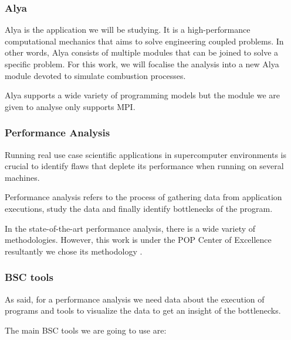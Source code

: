 \subsubsection{Alya}

\justify
Alya\cite{alya} is the application we will be studying.  It is a high-performance computational mechanics that aims to solve engineering coupled problems. In other words, Alya consists of multiple modules that can be joined to solve a specific problem. For this work, we will focalise the analysis into a new Alya module devoted to simulate combustion processes.

\justify
Alya supports a wide variety of programming models but the module we are given to analyse only supports MPI.

\subsubsection{Performance Analysis}

\justify
Running real use case scientific applications in supercomputer environments is crucial to identify flaws that deplete its performance when running on several machines.

\justify
Performance analysis refers to the process of gathering data from application executions, study the data and finally identify bottlenecks of the program.

\justify
In the state-of-the-art performance analysis, there is a wide variety of methodologies. However, this work is under the POP Center of Excellence resultantly we chose its methodology \cite{popMethod}.

\subsubsection{BSC tools}
\justify
As said, for a performance analysis we need data about the execution of programs and tools to visualize the data to get an insight of the bottlenecks.

\justify
The main BSC tools we are going to use are:

